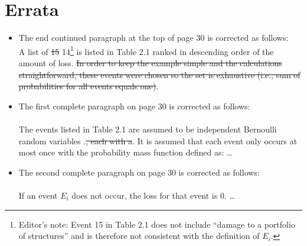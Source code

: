 \documentclass[]{article}
\begin{document}
\section{Errata}
\begin{itemize}
	\item The end continued paragraph at the top of page 30 is corrected as follows:\\
	A list of \color{red} \sout{15} 14\color{black}\footnote{Editor's note: Event 15 in Table 2.1 does not include ``damage to a portfolio of structures'' and is therefore not consistent with the definition of $E_i$.} is listed in Table 2.1 ranked in descending order of the amount of loss. \color{red} \sout{In order to keep the example simple and the calculations straightforward, these events were chosen so the set is exhaustive (i.e., sum of probabilities for all events equals one)}.\color{black}
	
\item The first complete paragraph on page 30 is corrected as follows:\\
\\
The events listed in Table 2.1 are assumed to be independent Bernoulli random variables \color{red} .\sout{, each with a}.  It is assumed that each event only occurs at most once with \color{red} the \color{black} probability mass function defined as: \ldots   

\item The second complete paragraph on page 30 is corrected as follows:\\
\\
If an event $E_i$ does not occur, the loss \color{red} for that event \color{black} is 0. \ldots 

\color{black}


\end{itemize}
\end{document}
